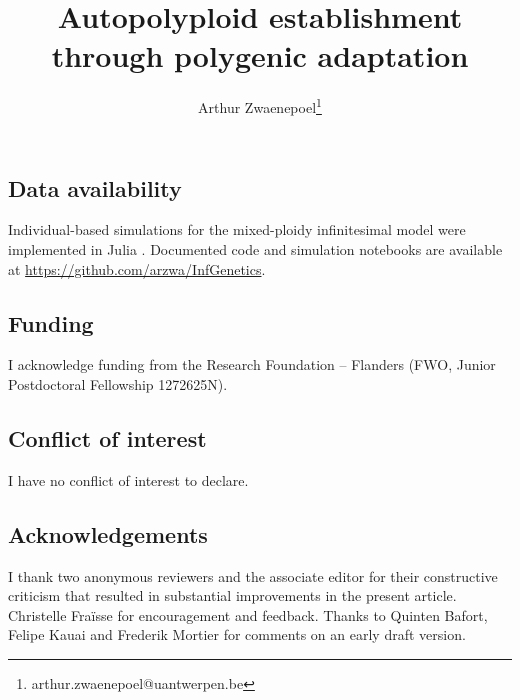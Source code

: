 \documentclass[12pt,a4paper]{article}
\begin{document}
\title{Autopolyploid establishment through polygenic adaptation}
\author[1]{Arthur Zwaenepoel\thanks{arthur.zwaenepoel@uantwerpen.be}}
\date{\vspace{-5ex}}
\maketitle

\subsection*{Data availability}

Individual-based simulations for the mixed-ploidy infinitesimal model were
implemented in Julia \citep{julia}.
Documented code and simulation notebooks are available at 
\url{https://github.com/arzwa/InfGenetics}.

\subsection*{Funding} 

I acknowledge funding from the Research Foundation -- Flanders (FWO, Junior
Postdoctoral Fellowship 1272625N).

\subsection*{Conflict of interest}

I have no conflict of interest to declare.

\subsection*{Acknowledgements}

I thank two anonymous reviewers and the associate editor for their constructive
criticism that resulted in substantial improvements in the present article.
Christelle Fraïsse for encouragement and feedback. Thanks to Quinten Bafort,
Felipe Kauai and Frederik Mortier for comments on an early draft version.




\end{document}

